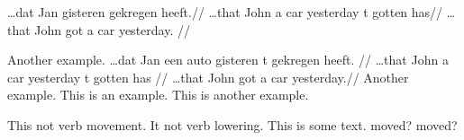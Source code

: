 \documentclass{article}
\begin{document}
\pex
\a\arrowgloss
\begingl[aboveglbskip=\glarrowheight]
\gla        \ldots dat Jan  gisteren    gekregen heeft.//
\glb        \ldots that John {a\hspace*{1em} car}  yesterday t  gotten has//
\glft       \ldots that John got a car yesterday.
// 
\endgl

\a Another example.
\a\begingl
\gla        \ldots dat Jan een auto gisteren t gekregen heeft.  //
\glb        \ldots that John a car  yesterday t gotten has  //
\glft       \ldots that John got a car yesterday.//
\endgl
\a Another example.
\xe
%
\pex
\a This is an example.
\a This is another example.
\xe


\pex
\a This  not  verb movement.
\a It   not  verb lowering.
\xe
This is some text.
\arrowstrut
\pex
\a{}   
moved? 
 
\a{}   
moved?  
\xe
\end{document}
